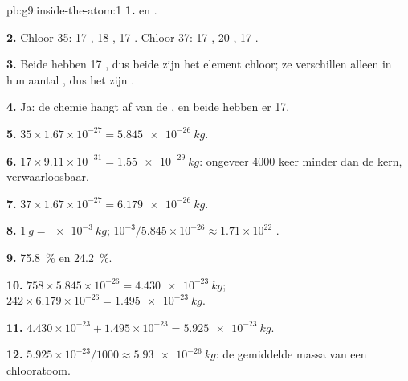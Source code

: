 \begin{solution}{pb:g9:inside-the-atom:1}
\textbf{1.}  en .

\textbf{2.} Chloor-35: 17 , 18 , 17 .
Chloor-37: 17 , 20 , 17 .

\textbf{3.} Beide hebben 17 , dus beide zijn het element chloor;
ze verschillen alleen in hun aantal , dus het zijn .

\textbf{4.} Ja: de chemie hangt af van de , en beide hebben er
17.

\textbf{5.} $35 \times 1.67 \times 10^{-27} = \qty{5.845e-26}{kg}$.

\textbf{6.} $17 \times 9.11 \times 10^{-31} = \qty{1.55e-29}{kg}$:
ongeveer 4000 keer minder dan de kern, verwaarloosbaar.

\textbf{7.} $37 \times 1.67 \times 10^{-27} = \qty{6.179e-26}{kg}$.

\textbf{8.} $\qty{1}{g} = \qty{e-3}{kg}$; $10^{-3} / 5.845 \times
10^{-26} \approx 1.71 \times 10^{22}$ .

\textbf{9.} \qty{75.8}{\percent} en \qty{24.2}{\percent}.

\textbf{10.} $758 \times 5.845 \times 10^{-26} = \qty{4.430e-23}{kg}$;
$242 \times 6.179 \times 10^{-26} = \qty{1.495e-23}{kg}$.

\textbf{11.} $4.430 \times 10^{-23} + 1.495 \times 10^{-23} =
\qty{5.925e-23}{kg}$.

\textbf{12.} $5.925 \times 10^{-23} / 1000 \approx
\qty{5.93e-26}{kg}$: de gemiddelde massa van een chlooratoom.
\end{solution}
